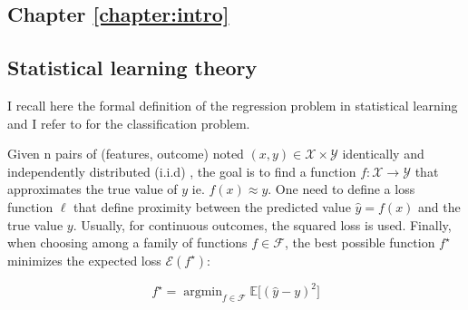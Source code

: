 \documentclass[french,12pt,twoside,a4paper]{book}
\DeclareMathOperator*{\argmin}{argmin} \def\mycitecolor{green!50!black}
\let\fontnumber\relax
\renewcommand{\thesection}{\fontnumber{\color{chaptercolor}\arabic{chapter}.}\arabic{section}}
\renewcommand{\thesubsection}{\fontnumber{\color{chaptercolor}\arabic{chapter}.}\arabic{section}.\arabic{subsection}}
\begin{document}

\clearpage
\begin{appendices}
  \renewcommand{\thechapter}{\Alph{chapter}} %
  \renewcommand{\thesection}{\thechapter.\arabic{section}} %
  \renewcommand{\thesubsection}{\thesection.\arabic{subsection}} %

  \chapter{Chapter \ref{chapter:intro}}\label{apd:intro}

  \section{Statistical learning theory}\label{apd:intro:statistical_learning}

  I recall here the formal definition of the regression problem in statistical
  learning and I refer to \cite{hastie2009elements} for the classification
  problem.

  Given n pairs of (features,
  outcome) noted $(x, y) \in \mathcal X \times \mathcal{Y}$ identically and
  independently distributed (i.i.d) , the goal is to find a function $f:
    \mathcal{X} \rightarrow \mathcal{Y}$ that approximates the true value of $y$
  ie. $f(x) \approx y$. One need to define a loss function $\ell$ that define
  proximity between the predicted value $\hat{y} = f(x)$ and the true value
  $y$. Usually, for continuous outcomes, the squared loss is used. Finally,
  when choosing among a family of functions $f \in \mathcal{F}$, the best possible function $f^{\star}$
  minimizes the expected loss $\mathcal{E}(f^{\star})$:

  \begin{equation}
    f^{\star} = \argmin_{f \in \mathcal{F}} \mathbb{E} \big [ (\hat{y} - y)^2 \big]
  \end{equation}


\end{appendices}
\end{document}
